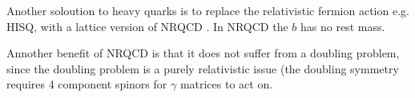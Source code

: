 Another soloution to heavy quarks is to replace the relativistic fermion action e.g. HISQ, with a lattice version of NRQCD \cite{Lepage:1992tx}. In NRQCD the $b$ has no rest mass.



Annother benefit of NRQCD is that it does not suffer from a doubling problem, since the doubling problem is a purely relativistic issue (the doubling symmetry requires 4 component spinors for $\gamma$ matrices to act on.

